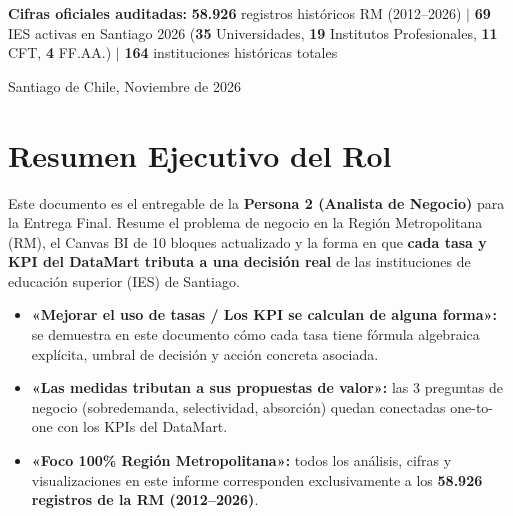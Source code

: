 \documentclass[11pt,a4paper]{article}
\begin{document}
\begin{titlepage}
    \vspace{1cm}
    \begin{tcolorbox}[colback=white, colframe=accentteal, arc=2mm]
      \centering\small
      \textbf{Cifras oficiales auditadas:} \textbf{58.926} registros históricos RM (2012--2026) $|$
      \textbf{69} IES activas en Santiago 2026 (\textbf{35} Universidades, \textbf{19} Institutos
      Profesionales, \textbf{11} CFT, \textbf{4} FF.AA.) $|$
      \textbf{164} instituciones históricas totales
    \end{tcolorbox}

    \vfill
    {\small\color{darkgray} Santiago de Chile, Noviembre de 2026}\par
\end{titlepage}

\tableofcontents
\newpage

\section{Resumen Ejecutivo del Rol}
\label{sec:resumen}

Este documento es el entregable de la \textbf{Persona 2 (Analista de Negocio)} para
la Entrega Final. Resume el problema de negocio en la Región Metropolitana (RM),
el Canvas BI de 10 bloques actualizado y la forma en que \textbf{cada tasa y KPI
del DataMart tributa a una decisión real} de las instituciones de educación
superior (IES) de Santiago.

\begin{tcolorbox}[colback=white, colframe=accentteal, breakable,
    title=\textbf{Respuesta al Feedback del Profesor (Hito 2)}]
\begin{itemize}[leftmargin=*]
    \item \textbf{«Mejorar el uso de tasas / Los KPI se calculan de alguna forma»:}
          se demuestra en este documento cómo cada tasa tiene fórmula algebraica
          explícita, umbral de decisión y acción concreta asociada.
    \item \textbf{«Las medidas tributan a sus propuestas de valor»:}
          las 3 preguntas de negocio (sobredemanda, selectividad, absorción)
          quedan conectadas one-to-one con los KPIs del DataMart.
    \item \textbf{«Foco 100\% Región Metropolitana»:}
          todos los análisis, cifras y visualizaciones en este informe corresponden
          exclusivamente a los \textbf{58.926 registros de la RM (2012--2026)}.
\end{itemize}
\end{tcolorbox}
\end{document}
